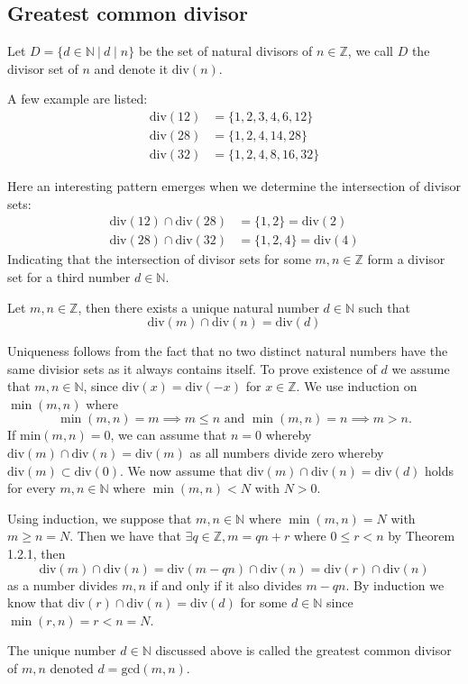\subsection{Greatest common divisor}
\begin{defi}
    Let $D=\{d\in\mathbb{N}~|~d\mid n\}$ be the set of natural divisors of $n\in\mathbb{Z}$, we call $D$ the divisor set of $n$ and denote it $\text{div}(n)$.
\end{defi}
\begin{exmp}
    A few example are listed:
    \begin{align*}
        \text{div}(12)&=\{1,2,3,4,6,12\} \\
        \text{div}(28)&=\{1,2,4,14,28\} \\
        \text{div}(32)&=\{1,2,4,8,16,32\}
    \end{align*}\vskip -10pt
\end{exmp}
Here an interesting pattern emerges when we determine the intersection of divisor sets:
\begin{align*}
    \text{div}(12)\cap\text{div}(28)&=\{1,2\}=\text{div}(2) \\
    \text{div}(28)\cap\text{div}(32)&=\{1,2,4\}=\text{div}(4)
\end{align*}
Indicating that the intersection of divisor sets for some $m,n\in\mathbb{Z}$ form a divisor set for a third number $d\in\mathbb{N}$.
\begin{lemm}[Euclid]
    Let $m,n\in\mathbb{Z}$, then there exists a unique natural number $d\in\mathbb{N}$ such that
    \[
        \text{div}(m)\cap\text{div}(n)=\text{div}(d)
    \]
\end{lemm}
\begin{prf}
    Uniqueness follows from the fact that no two distinct natural numbers have the same divisior sets as it always contains itself. To prove existence of $d$ we assume that $m,n\in\mathbb{N}$, since $\text{div}(x)=\text{div}(-x)$ for $x\in\mathbb{Z}$. We use induction on $\min(m,n)$ where
    \[
        \min(m,n)=m\implies m\leq n\text{ and }\min(m,n)=n\implies m>n
    .\]
    If $\text{min}(m,n)=0$, we can assume that $n=0$ whereby $\text{div}(m)\cap\text{div}(n)=\text{div}(m)$ as all numbers divide zero whereby $\text{div}(m)\subset\text{div}(0)$. We now assume that $\text{div}(m)\cap\text{div}(n)=\text{div}(d)$ holds for every $m,n\in\mathbb{N}$ where $\min(m,n)<N$ with $N>0$.

    Using induction, we suppose that $m,n\in\mathbb{N}$ where $\min(m,n)=N$ with $m\geq n=N$. Then we have that $\exists q\in\mathbb{Z},m=qn+r$ where $0\leq r<n$ by Theorem 1.2.1, then 
    \[
        \text{div}(m)\cap\text{div}(n)=\text{div}(m-qn)\cap\text{div}(n)=\text{div}(r)\cap\text{div}(n)
    \]
    as a number divides $m,n$ if and only if it also divides $m-qn$. By induction we know that $\text{div}(r)\cap\text{div}(n)=\text{div}(d)$ for some $d\in\mathbb{N}$ since $\min(r,n)=r<n=N$.
\end{prf}
\begin{defi}
    The unique number $d\in\mathbb{N}$ discussed above is called the greatest common divisor of $m,n$ denoted $d=\text{gcd}(m,n)$.
\end{defi}
